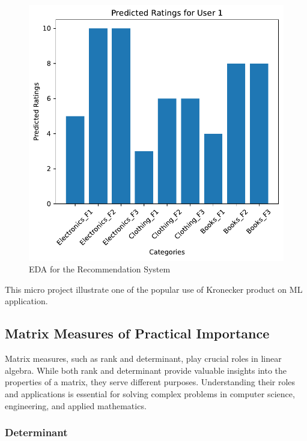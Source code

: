 \documentclass[
  letterpaper,
  DIV=11,
  numbers=noendperiod]{scrreprt}
\theoremstyle{plain}
\theoremstyle{definition}
\theoremstyle{remark}
\begin{document}
\begin{tcolorbox}
\begin{figure}[H]
{\includegraphics{module_2_files/figure-pdf/fig-reco-output-1.pdf}

}

\caption{\label{fig-reco}EDA for the Recommendation System}

\end{figure}%

This micro project illustrate one of the popular use of Kronecker
product on ML application.

\subsection{Matrix Measures of Practical
Importance}\label{matrix-measures-of-practical-importance}

Matrix measures, such as rank and determinant, play crucial roles in
linear algebra. While both rank and determinant provide valuable
insights into the properties of a matrix, they serve different purposes.
Understanding their roles and applications is essential for solving
complex problems in computer science, engineering, and applied
mathematics.

\subsubsection{Determinant}\label{determinant-1}


\end{tcolorbox}
\end{document}
